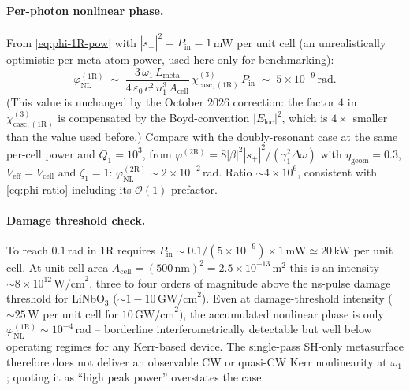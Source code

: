 \documentclass[11pt,a4paper]{article}
\newcommand{\eps}{\varepsilon}
\newcommand{\Dom}{\Delta\omega}
\newcommand{\chicascOneR}{\chi^{(3)}_{\text{casc},(1\mathrm R)}}
\begin{document}
\paragraph{Per-photon nonlinear phase.}
From \eqref{eq:phi-1R-pow} with $|s_+|^{2}=P_\text{in}=1\,$mW per unit cell
(an unrealistically optimistic per-meta-atom power, used here only for
benchmarking):
\begin{equation}
  \varphi_\text{NL}^{(1\mathrm R)}
   \;\sim\;\frac{3\,\omega_1\,L_\text{meta}}{4\,\eps_0\,c^{2}\,n_1^{3}\,A_\text{cell}}\,
            \chicascOneR\,P_\text{in}
   \;\sim\;5\!\times\!10^{-9}\,\text{rad}.
\end{equation}
(This value is unchanged by the October 2026 correction: the factor $4$
in $\chicascOneR$ is compensated by the Boyd-convention
$|E_\text{loc}|^2$, which is $4\times$ smaller than the value used
before.)  Compare with the doubly-resonant case at the same per-cell
power and $Q_1=10^{3}$, from $\varphi^{(2\mathrm R)}=8|\beta|^2|s_+|^2/(\gamma_1^2\Dom)$
with $\eta_\text{geom}=0.3$, $V_\text{eff}=V_\text{cell}$ and $\zeta_1=1$:
$\varphi_\text{NL}^{(2\mathrm R)}\sim 2\!\times\!10^{-2}\,$rad.
Ratio $\sim 4\!\times\!10^{6}$, consistent with \eqref{eq:phi-ratio}
including its $\mathcal O(1)$ prefactor.

\paragraph{Damage threshold check.}
To reach $0.1$\,rad in 1R requires $P_\text{in}\sim 0.1/(5\!\times\!10^{-9})
\times 1\,\text{mW}\simeq 20\,$kW per unit cell.  At unit-cell area
$A_\text{cell}=(500\,\text{nm})^{2}=2.5\!\times\!10^{-13}\,\text{m}^{2}$
this is an intensity $\sim 8\!\times\!10^{12}\,\text{W/cm}^{2}$, three to
four orders of magnitude above the ns-pulse damage threshold for
LiNbO$_3$ ($\sim 1\!-\!10\,\text{GW/cm}^{2}$).  Even at damage-threshold
intensity ($\sim 25\,$W per unit cell for $10\,\text{GW/cm}^{2}$), the
accumulated nonlinear phase is only
$\varphi_\text{NL}^{(1\mathrm R)}\sim 10^{-4}\,$rad -- borderline
interferometrically detectable but well below operating regimes for any
Kerr-based device.  The single-pass SH-only metasurface therefore does not
deliver an observable CW or quasi-CW Kerr nonlinearity at $\omega_1$;
quoting it as ``high peak power'' overstates the case.
\end{document}
